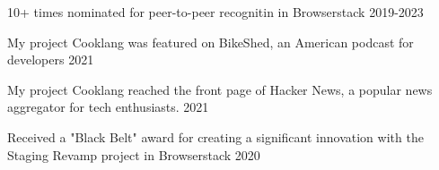 
\begin{cventries}

  \cvblitz
    {10+ times nominated for peer-to-peer recognitin in Browserstack}
    {}
    {}
    {}
    {2019-2023} %


  \cvblitz
    {My project Cooklang was featured on BikeShed, an American podcast for developers}
    {}
    {}
    {}
    {2021} %

  \cvblitz
    {My project Cooklang reached the front page of Hacker News, a popular news aggregator for tech enthusiasts.}
    {}
    {}
    {}
    {2021} %


  \cvblitz
    {Received a "Black Belt" award for creating a significant innovation with the Staging Revamp project in Browserstack}
    {}
    {}
    {}
    {2020} %

\end{cventries}
